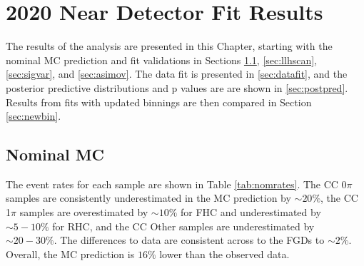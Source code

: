 \chapter{2020 Near Detector Fit Results}\label{sec:2020Fit}

The results of the analysis are presented in this Chapter, starting with the nominal MC prediction and fit validations in Sections \ref{sec:nommc}, \ref{sec:llhscan}, \ref{sec:sigvar}, and \ref{sec:asimov}. The data fit is presented in \ref{sec:datafit}, and the posterior predictive distributions and p values are are shown in \ref{sec:postpred}. Results from fits with updated binnings are then compared in Section \ref{sec:newbin}.

\section{Nominal MC}\label{sec:nommc}

The event rates for each sample are shown in Table \ref{tab:nomrates}. The CC 0$\pi$ samples are consistently underestimated in the MC prediction by $\sim20\%$, the CC 1$\pi$ samples are overestimated by $\sim10\%$ for FHC and underestimated by $\sim5-10\%$ for RHC, and the CC Other samples are underestimated by $\sim20-30\%$. The differences to data are consistent across to the FGDs to $\sim2\%$. Overall, the MC prediction is $16\%$ lower than the observed data.

